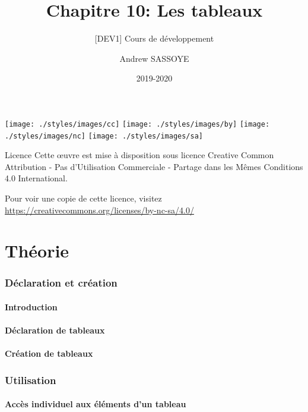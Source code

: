 \documentclass{beamer}
\title{Chapitre 10: Les tableaux}
\subtitle{\tiny [DEV1] Cours de d\'eveloppement}
\author{Andrew SASSOYE}
\date{2019-2020}
\begin{document}
	\begin{frame}
		\titlepage
	\end{frame}

	\begin{frame}
		\begin{center}
			\texttt{[image: ./styles/images/cc]}
			\texttt{[image: ./styles/images/by]}
			\texttt{[image: ./styles/images/nc]}
			\texttt{[image: ./styles/images/sa]}
		\end{center}

		\begin{block}{Licence}
			\small Cette \oe uvre est mise \`a disposition sous licence Creative Common
			Attribution - Pas d\rq Utilisation Commerciale - Partage dans les M\^emes Conditions 4.0 International.
		\end{block}

		\tiny Pour voir une copie de cette licence, visitez
		\href{https://creativecommons.org/licenses/by-nc-sa/4.0/}{https://creativecommons.org/licenses/by-nc-sa/4.0/}
	\end{frame}

    \part{Th\'eorie}
    \frame{\partpage}

    \section{D\'eclaration et cr\'eation}\label{sec:declaration-et-creation}
        \subsection{Introduction}\label{subsec:introduction}
        \subsection{D\'eclaration de tableaux}\label{subsec:declaration-de-tableaux}
        \subsection{Cr\'eation de tableaux}\label{subsec:creation-de-tableaux}

    \section{Utilisation}
        \subsection{Acc\`es individuel aux \'el\'ements d'un tableau}\label{subsec:acces-individuel-aux-elements-dun-tableau}
\end{document}
